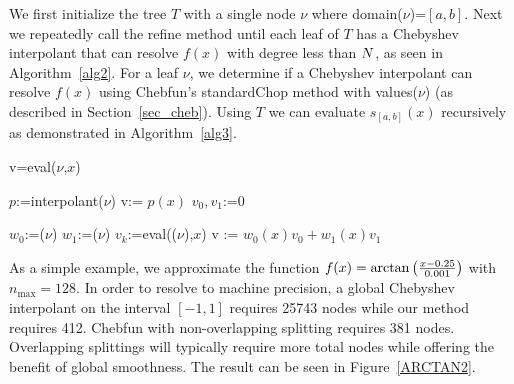 We first initialize the tree $T$ with a single node $\nu$ where \textsf{domain}($\nu$)=$[a,b]$. Next we repeatedly call the refine method until each leaf of $T$ has a Chebyshev interpolant that can resolve $f(x)$ with degree less than $N$, as seen in Algorithm~\ref{alg2}. For a leaf $\nu$, we determine if a Chebyshev interpolant can resolve $f(x)$ using Chebfun's standardChop method with \textsf{values}($\nu$) (as described in Section~\ref{sec_cheb}). Using $T$ we can evaluate $s_{[a,b]}(x)$ recursively as demonstrated in Algorithm~\ref{alg3}. 





\begin{algorithm}[!h]
\caption{v=eval($\nu$,$x$)}
\label{alg3}
\begin{algorithmic}
\STATE $p$:=\textsf{interpolant}($\nu$)
\STATE v:= $p(x)$
\ELSE
\STATE $v_0,v_1$:=0

\STATE $w_0$:=($\nu$)
\STATE $w_1$:=($\nu$)
\STATE $v_k$:=eval(($\nu$),$x$)
\ENDIF
\ENDFOR
\STATE v := $w_0(x)v_0 + w_1(x)v_1$
\ENDIF
\end{algorithmic}
\end{algorithm}

As a simple example, we approximate the function $f(x)=\arctan \left( \frac{x-0.25}{0.001} \right)$ with $n_{\max}=128$. In order to resolve to machine precision, a global Chebyshev interpolant on the interval $[-1,1]$ requires 25743 nodes while our method requires 412. Chebfun with non-overlapping splitting requires 381 nodes. Overlapping splittings will typically require more total nodes while offering the benefit of global smoothness. The result can be seen in Figure~\ref{ARCTAN2}.

